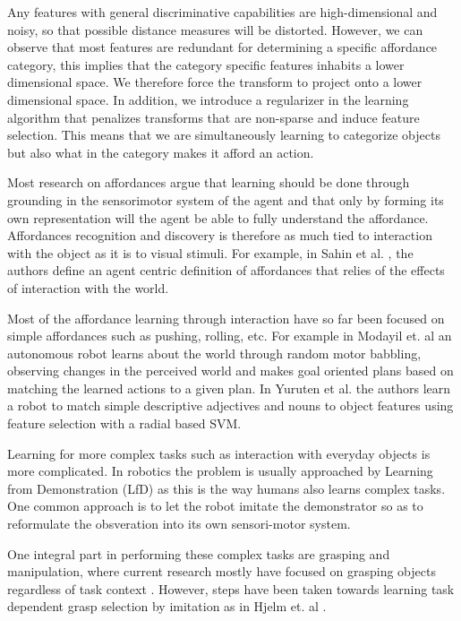 Any features with general discriminative capabilities are
high-dimensional and noisy, so that possible distance measures will be
distorted. However, we can observe that most features are redundant for
determining a specific affordance category, this implies that the
category specific features inhabits a lower dimensional space. We
therefore force the transform to project onto a lower dimensional space.
In addition, we introduce a regularizer in the learning algorithm that
penalizes transforms that are non-sparse and induce feature selection.
This means that we are simultaneously learning to categorize objects but
also what in the category makes it afford an action.

Most research on affordances argue that learning should be done through
grounding in the sensorimotor system of the agent and that only by
forming its own representation will the agent be able to fully
understand the affordance. Affordances recognition and discovery is
therefore as much tied to interaction with the object as it is to visual
stimuli. For example, in Sahin et al. \cite{Sahin:2007gr}, the authors
define an agent centric definition of affordances that relies of the
effects of interaction with the world.

Most of the affordance learning through interaction have so far been
focused on simple affordances such as pushing, rolling, etc. For example
in Modayil et. al \cite{Modayil:2008it} an autonomous robot learns about
the world through random motor babbling, observing changes in the
perceived world and makes goal oriented plans based on matching the
learned actions to a given plan. In Yuruten et al. \cite{Yuruten:2013hr}
the authors learn a robot to match simple descriptive adjectives and
nouns to object features using feature selection with a radial based
SVM.

Learning for more complex tasks such as interaction with everyday
objects is more complicated. In robotics the problem is usually
approached by Learning from Demonstration (LfD) as this is the way
humans also learns complex tasks. One common approach is to let the
robot imitate the demonstrator so as to reformulate the obsveration into
its own sensori-motor system.

One integral part in performing these complex tasks are grasping and
manipulation, where current research mostly have focused on grasping
objects regardless of task context \cite{Bohg:H95zG3Ya}. However, steps
have been taken towards learning task dependent grasp selection by
imitation as in Hjelm et. al \cite{Hjelm:2015hw}.

